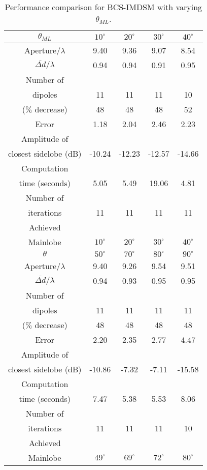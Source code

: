 \documentclass[10pt,final]{IEEEtran}
\begin{document}
\begin{table}
\caption{\rm Performance comparison for BCS-IMDSM with varying $\theta_{ML}$.} \centering
\begin{tabular}{|c|c|c|c|c|}
  \hline
  $\theta_{ML}$ & $10^{\circ}$ & $20^{\circ}$ & $30^{\circ}$ & $40^{\circ}$ \\
  \hline
  Aperture/$\lambda$ & 9.40 &9.36  &9.07  & 8.54 \\
  $\overline{\Delta{d}}/\lambda$ & 0.94 & 0.94 &0.91  & 0.95  \\
  \hline
  Number of &  &  &  &   \\
  dipoles &11 & 11 &11  &10 \\
  ($\%$ decrease) & 48 & 48 & 48&52 \\
  \hline
  Error &1.18  &2.04  &2.46  &2.23   \\
  \hline
  Amplitude of &  &  &  &   \\
  closest sidelobe (dB)&-10.24  &-12.23  &-12.57  &-14.66  \\
  \hline
  Computation &  &  & &   \\
  time (seconds) &5.05  &5.49  &19.06  &4.81   \\
  \hline
  Number of &  &  & &   \\
  iterations & 11 &11  &11  &11   \\
  \hline
  Achieved & & & & \\
   Mainlobe & $10^{\circ}$ &$20^{\circ}$  &$30^{\circ}$  &$40^{\circ}$   \\
  \hline
  \hline
  $\theta$ & $50^{\circ}$  & $70^{\circ}$ & $80^{\circ}$ & $90^{\circ}$\\
  \hline
  Aperture/$\lambda$ &9.40 &9.26 &9.54 &9.51 \\
  $\overline{\Delta{d}}/\lambda$ & 0.94& 0.93&0.95 &0.95  \\
  \hline
  Number of  & & & &  \\
  dipoles &11 &11 &11 &11 \\
  ($\%$ decrease) & 48 & 48 &48 &48  \\
  \hline
  Error &2.20 &2.35 &2.77 &4.47  \\
  \hline
  Amplitude of  & & & &  \\
  closest sidelobe (dB)&-10.86 &-7.32 &-7.11  &-15.58 \\
  \hline
  Computation  & & & &  \\
  time (seconds) &7.47 &5.38 &5.53 &8.06  \\
  \hline
  Number of  & & & &  \\
  iterations &11 &11 &11 &10  \\
  \hline
  Achieved & & & & \\
   Mainlobe &  $49^{\circ}$&$69^{\circ}$  &$72^{\circ}$  &$80^{\circ}$   \\
  \hline
\end{tabular}
\label{tb:offbcs1}
\end{table}
\end{document}
